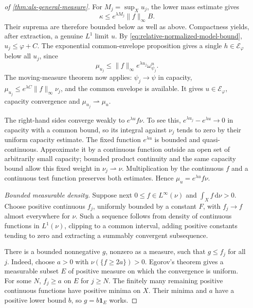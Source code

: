 \begin{proof}[of \cref{thm:als-general-measure}]
For $M_j=\sup_Xu_j$, the lower mass estimate gives
\[
 \kappa\leq e^{\lambda M_j}\|f\|_\infty B.
\]
Their suprema are therefore bounded below as well as above. Compactness yields, after extraction, a genuine $L^1$ limit $u$. By \eqref{eq:relative-normalized-model-bound}, $u_j\leq\varphi+C$. The exponential common-envelope proposition gives a single $h\in\mathcal E_\varphi$ below all $u_j$, since
\[
 \mu_{u_j}\leq\|f\|_\infty e^{\lambda u_j}\omega_{\psi_j}^n.
\]
The moving-measure theorem now applies: $\psi_j\to\psi$ in capacity, $\mu_{u_j}\leq e^{\lambda C}\|f\|_\infty\nu_j$, and the common envelope is available. It gives $u\in\mathcal E_\varphi$, capacity convergence and $\mu_{u_j}\rightharpoonup\mu_u$.

The right-hand sides converge weakly to $e^{\lambda u}f\nu$. To see this, $e^{\lambda u_j}-e^{\lambda u}\to0$ in capacity with a common bound, so its integral against $\nu_j$ tends to zero by their uniform capacity estimate. The fixed function $e^{\lambda u}$ is bounded and quasi-continuous. Approximate it by a continuous function outside an open set of arbitrarily small capacity; bounded product continuity and the same capacity bound allow this fixed weight in $\nu_j\rightharpoonup\nu$. Multiplication by the continuous $f$ and a continuous test function preserves both estimates. Hence $\mu_u=e^{\lambda u}f\nu$.

\emph{Bounded measurable density.} Suppose next $0\leq f\in L^\infty(\nu)$ and $\int_Xf\,\mathrm{d}\nu>0$. Choose positive continuous $f_j$, uniformly bounded by a constant $F$, with $f_j\to f$ almost everywhere for $\nu$. Such a sequence follows from density of continuous functions in $L^1(\nu)$, clipping to a common interval, adding positive constants tending to zero and extracting a summably convergent subsequence.

There is a bounded nonnegative $g$, nonzero as a measure, such that $g\leq f_j$ for all $j$. Indeed, choose $a>0$ with $\nu(\{f\geq2a\})>0$. Egorov's theorem gives a measurable subset $E$ of positive measure on which the convergence is uniform. For some $N$, $f_j\geq a$ on $E$ for $j\geq N$. The finitely many remaining positive continuous functions have positive minima on $X$. Their minima and $a$ have a positive lower bound $b$, so $g=b\mathbf1_E$ works.


\end{proof}
